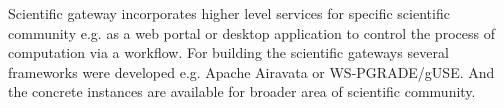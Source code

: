 Scientific gateway incorporates higher level services for specific scientific community e.g. as a web portal or desktop application to control the process of computation via a workflow\cite{Wilkins-Diehr2007}. For building the scientific gateways several frameworks were developed e.g. Apache Airavata \cite{Pierce2014,Memon2014} or WS-PGRADE/gUSE\cite{Kacsuk2012}. And the concrete instances are available for broader area of scientific community. 



